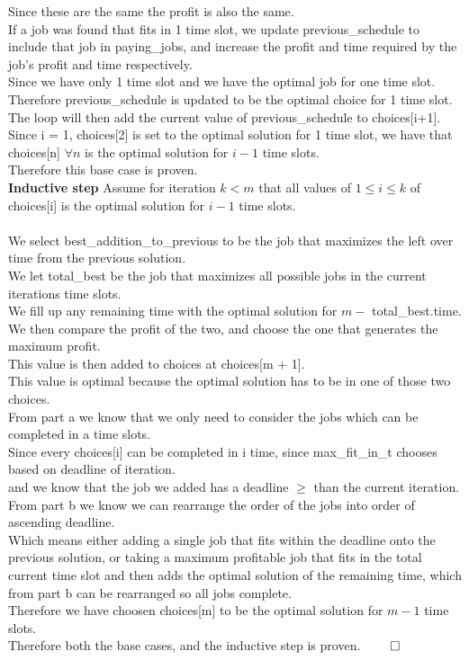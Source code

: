 \documentclass{article}
\begin{document}
        Since these are the same the profit is also the same.\\
        If a job was found that fits in 1 time slot, we update previous\_schedule to include that job in paying\_jobs, and increase the profit and time required by the job's profit and time respectively.\\
        Since we have only 1 time slot and we have the optimal job for one time slot.\\
        Therefore previous\_schedule is updated to be the optimal choice for 1 time slot.
        The loop will then add the current value of previous\_schedule to choices[i+1].\\
        Since i = 1, choices[2] is set to the optimal solution for 1 time slot, we have that choices[n] $\forall n$ is the optimal solution for $i - 1$ time slots.\\
        Therefore this base case is proven.\\
        \textbf{Inductive step} Assume for iteration $k < m$ that all values of $1 \leq i \leq k$ of choices[i] is the optimal solution for $i - 1$ time slots.\\
        \\
        We select best\_addition\_to\_previous to be the job that maximizes the left over time from the previous solution.\\
        We let total\_best be the job that maximizes all possible jobs in the current iterations time slots.\\
        We fill up any remaining time with the optimal solution for $m -$ total\_best.time.\\
        We then compare the profit of the two, and choose the one that generates the maximum profit.\\
        This value is then added to choices at choices[m + 1]. \\
        This value is optimal because the optimal solution has to be in one of those two choices.\\
        From part a we know that we only need to consider the jobs which can be completed in a time slots.\\
        Since every choices[i] can be completed in i time, since max\_fit\_in\_t chooses based on deadline of iteration.\\
        and we know that the job we added has a deadline $\geq$ than the current iteration.\\
        From part b we know we can rearrange the order of the jobs into order of ascending deadline.\\
        Which means either adding a single job that fits within the deadline onto the previous solution, or taking a maximum profitable job that fits in the total current time slot and then adds the optimal solution of the remaining time, which from part b can be rearranged so all jobs complete.\\
        Therefore we have choosen choices[m] to be the optimal solution for $m - 1$ time slots.\\
        Therefore both the base cases, and the inductive step is proven. $\qed$\\
\end{document}
